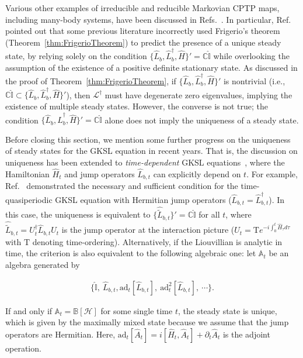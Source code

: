 \documentclass[preprint,pteplogo]{ptephy_v2}%
\numberwithin{equation}{section}
\theoremstyle{definition}
\newcommand{\mc}[1]{\mathcal{#1}}
\newcommand{\mbb}[1]{\mathbb{#1}}
\newcommand{\aln}[1]{
\begin{align}
#1
\end{align}
}
\begin{document}
Various other examples of irreducible and reducible Markovian CPTP maps, including many-body systems, have been discussed in Refs.~\cite{yoshida2024uniqueness, zhang2024criteria}. 
In particular, Ref.~\cite{zhang2024criteria} pointed out that some previous literature incorrectly used Frigerio's theorem (Theorem~\ref{thm:FrigerioTheorem}) to predict the presence of a unique steady state, by relying solely on the condition $\{ \hat{L}_b, \hat{L}_b^\dagger, \hat{H} \}' = \mathbb{C} \hat{\mathbb{I}}$ while overlooking the assumption of the existence of a positive definite stationary state.
As discussed in the proof of Theorem~\ref{thm:FrigerioTheorem}, if $\{ \hat{L}_b, \hat{L}_b^\dagger, \hat{H} \}'$ is nontrivial (i.e., $\mathbb{C} \hat{\mbb{I}} \subset \{ \hat{L}_b, \hat{L}_b^\dagger, \hat{H} \}'$), then $\mc{L}^\dagger$ must have degenerate zero eigenvalues, implying the existence of multiple steady states.
However, the converse is not true; the condition $\{ \hat{L}_b, \hat{L}_b^\dagger, \hat{H} \}' = \mbb{C} \hat{\mbb{I}}$ alone does not imply the uniqueness of a steady state.

Before closing this section, we mention some further progress on the uniqueness of steady states for the GKSL equation in recent years.
That is, the discussion on  uniqueness has been extended to \textit{time-dependent} GKSL equations~\cite{menczel2019limit,di2024asymptotic,yoshida2026theory,wolff2026contractivity}, where the Hamiltonian $\hat{H}_t$ and jump operators $\hat{L}_{b,t}$ can explicitly depend on $t$.
For example, Ref.~\cite{yoshida2026theory} demonstrated the necessary and sufficient condition for the time-quasiperiodic GKSL equation with Hermitian jump operators ($\hat{L}_{b,t}=\hat{L}_{b,t}^\dag$).
In this case, the uniqueness is equivalent to $\{\hat{\tilde{L}}_{b,t}\}'=\mathbb{C}\hat{\mathbb{I}}$ for all $t$, where $\hat{\tilde{L}}_{b,t}=U_t^\dag\hat{L}_{b,t}U_t$ is the jump operator at the interaction picture ($U_t=\mathrm{T}e^{-i\int_0^t\hat{H}_\tau d\tau}$ with $\mathrm{T}$ denoting time-ordering).
Alternatively, if the Liouvillian is analytic in time, the criterion is also equivalent to the following algebraic one:
let $\mathbb{A}_t$ be an algebra generated by
\aln{
\{\hat{\mathbb{I}},\:\hat{L}_{b,t},\mathrm{ad} _t[\hat{L}_{b,t}],\:\mathrm{ad}_t^2[\hat{L}_{b,t}],\:\cdots \}.
}
If and only if $\mathbb{A}_t=\mathbb{B}[\mathcal{H}]$ for some single time $t$, the steady state is unique, which is given by the maximally mixed state  because we assume that the jump operators are Hermitian.
Here, $\mathrm{ad}_t[\hat{A}_t]=i[\hat{H}_t,\hat{A}_t]+\partial_t\hat{A}_t$ is the adjoint operation.
\end{document}
